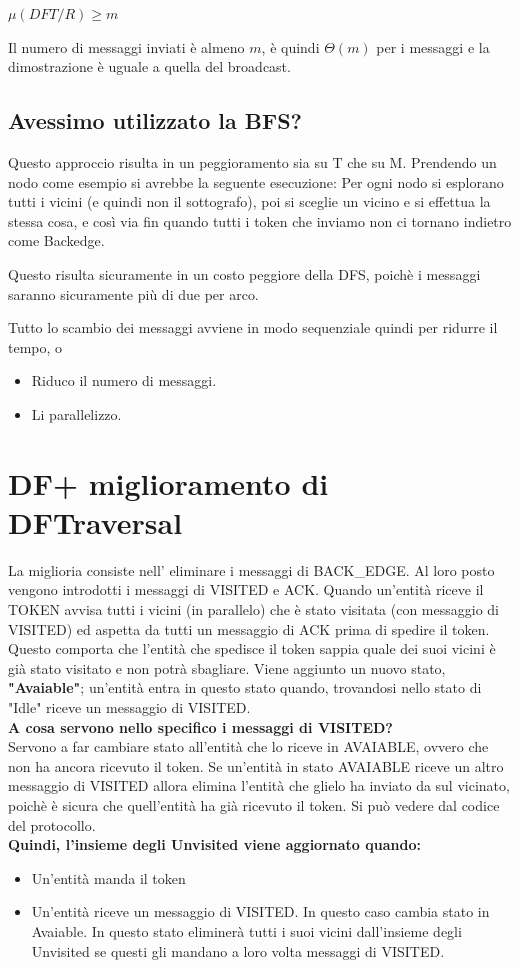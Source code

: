 \begin{center}
  $\mu(DFT/R) \geq m$
\end{center}
  Il numero di messaggi inviati è almeno $m$, è quindi $\Theta(m)$ per i messaggi e la dimostrazione è uguale a quella del broadcast.

\subsection{Avessimo utilizzato la BFS?}
Questo approccio risulta in un peggioramento sia su T che su M. Prendendo un nodo come esempio si avrebbe la seguente esecuzione:
Per ogni nodo si esplorano tutti i vicini (e quindi non il sottografo), poi si sceglie un vicino e si effettua la stessa cosa, e così via fin quando tutti i token che inviamo non ci tornano indietro come Backedge.

Questo risulta sicuramente in un costo peggiore della DFS, poichè i messaggi saranno sicuramente più di due per arco.

Tutto lo scambio dei messaggi avviene in modo sequenziale quindi per ridurre il tempo, o
\begin{itemize}
    \item Riduco il numero di messaggi.
    \item Li parallelizzo.
\end{itemize}

\section{DF+ miglioramento di DFTraversal}
La miglioria consiste nell' eliminare i messaggi di BACK\_EDGE. Al loro posto vengono introdotti i messaggi di VISITED e ACK. Quando un'entità riceve il TOKEN avvisa tutti i vicini (in parallelo) che è stato visitata (con messaggio di VISITED) ed aspetta da tutti un messaggio di ACK prima di spedire il token. Questo comporta che l'entità che spedisce il token sappia quale dei suoi vicini è già stato visitato e non potrà sbagliare. Viene aggiunto un nuovo stato, \textbf{"Avaiable"}; un'entità entra in questo stato quando, trovandosi nello stato di "Idle" riceve un messaggio di VISITED.\\

\textbf{A cosa servono nello specifico i messaggi di VISITED?}\\
Servono a far cambiare stato all'entità che lo riceve in AVAIABLE, ovvero che non ha ancora ricevuto il token. Se un'entità in stato AVAIABLE riceve un altro messaggio di VISITED allora elimina l'entità che glielo ha inviato da sul vicinato, poichè è sicura che quell'entità ha già ricevuto il token. Si può vedere dal codice del protocollo.\\
\textbf{Quindi, l'insieme degli Unvisited viene aggiornato quando:}
\begin{itemize}
    \item Un'entità manda il token
    \item Un'entità riceve un messaggio di VISITED. In questo caso cambia stato in Avaiable. In questo stato eliminerà tutti i suoi vicini dall'insieme degli Unvisited se questi gli mandano a loro volta messaggi di VISITED.
\end{itemize}

